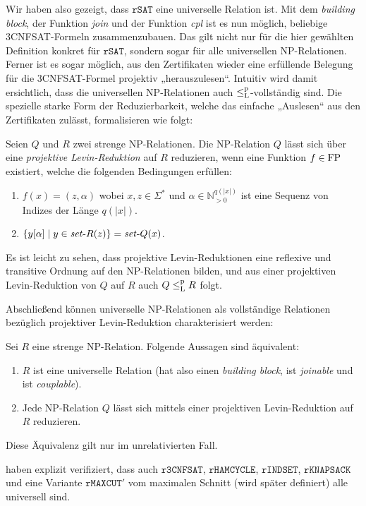 Wir haben also gezeigt, dass $\mathtt{rSAT}$ eine universelle Relation ist.
Mit dem \emph{building block}, der Funktion \emph{join} und der Funktion \emph{cpl} ist es nun möglich, beliebige 3CNFSAT-Formeln zusammenzubauen.
Das gilt nicht nur für die hier gewählten Definition konkret für $\mathtt{rSAT}$, sondern sogar für alle universellen NP-Relationen.
Ferner ist es sogar möglich, aus den Zertifikaten wieder eine erfüllende Belegung für die 3CNFSAT-Formel projektiv „herauszulesen“.
Intuitiv wird damit ersichtlich, dass die universellen NP-Relationen auch $\leq_\mathrm{L}^\mathrm{p}$-vollständig sind.
Die spezielle starke Form der Reduzierbarkeit, welche das einfache „Auslesen“ aus den Zertifikaten zulässt, formalisieren \citeauthor{agrawal_universal_1992} wie folgt:
\begin{definition}\label{def:projective-reduction}
    Seien $Q$ und $R$ zwei strenge NP-Relationen.
    Die NP-Relation $Q$ lässt sich über eine \emph{projektive Levin-Reduktion} auf $R$ reduzieren, wenn eine Funktion $f\in\mathrm{FP}$ existiert, welche die folgenden Bedingungen erfüllen:
    \begin{enumerate}
        \item $f(x)=(z,\alpha)$ wobei $x,z\in\Sigma^*$ und $\alpha\in\mathbb N_{>0}^{q(|x|)}$ ist eine Sequenz von Indizes der Länge $q(|x|)$.
        \item $\{ y[\alpha] \mid y\in \mathit{set}\text{-}{}R(z) \} = \mathit{set}\text{-}{}Q(x)$. \qedhere
    \end{enumerate}
\end{definition}
Es ist leicht zu sehen, dass projektive Levin-Reduktionen eine reflexive und transitive Ordnung auf den NP-Relationen bilden, und aus einer projektiven Levin-Reduktion von $Q$ auf $R$ auch $Q\leq_\mathrm{L}^\mathrm{p} R$ folgt. 

Abschließend können universelle NP-Relationen als vollständige Relationen bezüglich projektiver Levin-Reduktion charakterisiert werden:
\begin{theorem}\label{thm:universal-relations}
    Sei $R$ eine strenge NP-Relation.
    Folgende Aussagen sind äquivalent:
    \begin{enumerate}
        \item $R$ ist eine universelle Relation (hat also einen \emph{building block}, ist \emph{joinable} und ist \emph{couplable}).
        \item Jede NP-Relation $Q$ lässt sich mittels einer projektiven Levin-Reduktion auf $R$ reduzieren.
    \end{enumerate}
    Diese Äquivalenz gilt nur im unrelativierten Fall.
\end{theorem}
\textcite{agrawal_universal_1992} haben explizit verifiziert, dass auch $\mathtt{r3CNFSAT}$, $\mathtt{rHAMCYCLE}$, $\mathtt{rINDSET}$, $\mathtt{rKNAPSACK}$ und eine Variante $\mathtt{rMAXCUT}'$ vom maximalen Schnitt (wird später definiert) alle universell sind.

